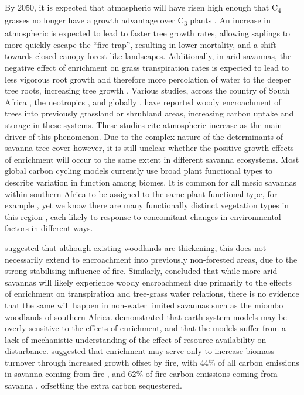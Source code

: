 \begin{refsection}
By 2050, it is expected that atmospheric \co{} will have risen high enough that C\textsubscript{4} grasses no longer have a growth advantage over C\textsubscript{3} plants \citep{Bond2012}. An increase in atmospheric \co{} is expected to lead to faster tree growth rates, allowing saplings to more quickly escape the ``fire-trap'', resulting in lower mortality, and a shift towards closed canopy forest-like landscapes. Additionally, in arid savannas, the negative effect of \co{} enrichment on grass transpiration rates is expected to lead to less vigorous root growth and therefore more percolation of water to the deeper tree roots, increasing tree growth \citep{Murphy2012}. Various studies, across the country of South Africa \citep{Stevens2016b}, the neotropics \citep{Rosan2019}, and globally \citep{Stevens2016}, have reported woody encroachment of trees into previously grassland or shrubland areas, increasing carbon uptake and storage in these systems. These studies cite atmospheric \co{} increase as the main driver of this phenomenon. Due to the complex nature of the determinants of savanna tree cover however, it is still unclear whether the positive growth effects of \co{} enrichment will occur to the same extent in different savanna ecosystems. Most global carbon cycling models currently use broad plant functional types to describe variation in function among biomes. It is common for all mesic savannas within southern Africa to be assigned to the same plant functional type, for example \citep{Atkin2015, Whitley2017}, yet we know there are many functionally distinct vegetation types in this region \citep{Campbell1996}, each likely to response to concomitant changes in environmental factors in different ways. 

\citet{Lewis2009} suggested that although existing woodlands are thickening, this does not necessarily extend to encroachment into previously non-forested areas, due to the strong stabilising influence of fire. Similarly, \citet{Pelletier2018} concluded that while more arid savannas will likely experience woody encroachment due primarily to the effects of \co{} enrichment on transpiration and tree-grass water relations, there is no evidence that the same will happen in non-water limited savannas such as the miombo woodlands of southern Africa. \citet{Reich2014} demonstrated that earth system models may be overly sensitive to the effects of \co{} enrichment, and that the models suffer from a lack of mechanistic understanding of the effect of resource availability on disturbance. \citet{Korner2017} suggested that \co{} enrichment may serve only to increase biomass turnover through increased growth offset by fire, with 44\% of all carbon emissions in savanna coming from fire \citep{Werf2010}, and 62\% of fire carbon emissions coming from savanna \citep{Werf2017}, offsetting the extra carbon sequestered.


\end{refsection}
